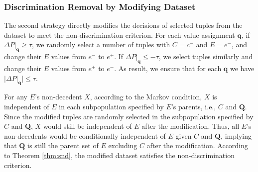 \documentclass[twoside,leqno,twocolumn]{article}
\begin{document}

\subsubsection{Discrimination Removal by Modifying Dataset}
The second strategy directly modifies the decisions of selected tuples from the dataset to meet the non-discrimination criterion. For each value assignment $\mathbf{q}$, if $\Delta P|_{\mathbf{q}}\geq \tau$, we randomly select a number of tuples with $C=c^{-}$ and $E=e^{-}$, and change their $E$ values from $e^{-}$ to $e^{+}$. If $\Delta P|_{\mathbf{q}}\leq -\tau$, we select tuples similarly and change their $E$ values from $e^{+}$ to $e^{-}$. As result, we ensure that for each $\mathbf{q}$ we have $|\Delta P|_{\mathbf{q}}|\leq \tau$. 

For any $E$'s non-decedent $X$, according to the Markov condition, $X$ is independent of $E$ in each subpopulation specified by $E$'s parents, i.e., $C$ and $\mathbf{Q}$. Since the modified tuples are randomly selected in the subpopulation specified by $C$ and $\mathbf{Q}$, $X$ would still be independent of $E$ after the modification. Thus, all $E$'s non-decedents would be conditionally independent of $E$ given $C$ and $\mathbf{Q}$, implying that $\mathbf{Q}$ is still the parent set of $E$ excluding $C$ after the modification. According to Theorem \ref{thm:snd}, the modified dataset satisfies the non-discrimination criterion.
\end{document}
